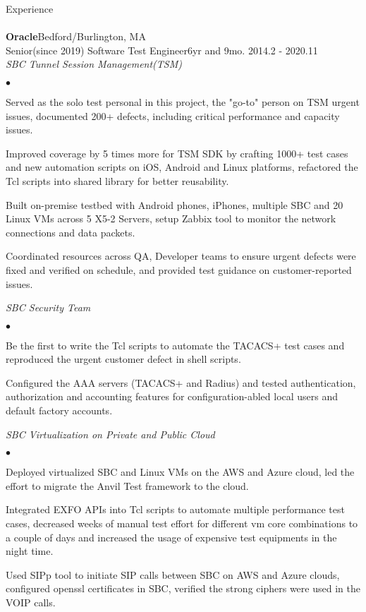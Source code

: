 \documentclass[10pt]{article}
\newcommand{\lineunder}{\vspace*{-8pt}\\\hspace*{-18pt}\hrulefill\\}
\newcommand{\header}[1]{{\hspace*{-15pt}\vspace*{6pt}\large{{#1}}}\vspace*{-6pt}\lineunder}
\newcommand{\company}[5]{
    \large{\textbf{#1}}\hfill \small{#3}\\
    #2\hfill \small{#4}\small{#5}\\
}
\newcommand{\project}[1]{\checkmark\normalsize{{\emph{#1}}}\\}
\newenvironment{achievements}
    {\begin{list}
        {$\bullet$}{\topsep 0pt \itemsep -1pt}} 
    {\end{list}}
\begin{document}
\header{Experience}


\company{Oracle}{Senior(since 2019) Software Test Engineer}{Bedford/Burlington, MA}{6yr and 9mo. }{2014.2 - 2020.11}

\project{SBC Tunnel Session Management(TSM)}
  \begin{achievements}
\item Served as the solo test personal in this project, the "go-to" person on TSM urgent issues, documented 200+ defects, including critical performance and capacity issues.
\item Improved coverage by 5 times more for TSM SDK by crafting 1000+ test cases and new automation scripts on iOS, Android and Linux platforms, refactored the Tcl scripts into shared library for better reusability.
\item Built on-premise testbed with Android phones, iPhones, multiple SBC and 20 Linux VMs across 5 X5-2 Servers, setup Zabbix tool to monitor the network connections and data packets.
\item Coordinated resources across QA, Developer teams to ensure urgent defects were fixed and verified on schedule, and provided test guidance on customer-reported issues.
  \end{achievements}


\project{SBC Security Team}
  \begin{achievements}
\item Be the first to write the Tcl scripts to automate the TACACS+ test cases and reproduced the urgent customer defect in shell scripts.
\item Configured the AAA servers (TACACS+ and Radius) and tested authentication, authorization and accounting features for configuration-abled local users and default factory accounts.
  \end{achievements}


\project{SBC Virtualization on Private and Public Cloud}
  \begin{achievements}
\item Deployed virtualized SBC and Linux VMs on the AWS and Azure cloud, led the effort to migrate the Anvil Test framework to the cloud.
\item Integrated EXFO APIs into Tcl scripts to automate multiple performance test cases, decreased weeks of manual test effort for different vm core combinations to a couple of days and increased the usage of expensive test equipments in the night time.
\item Used SIPp tool to initiate SIP calls between SBC on AWS and Azure clouds, configured openssl certificates in SBC, verified the strong ciphers were used in the VOIP calls.
  \end{achievements}
\end{document}
